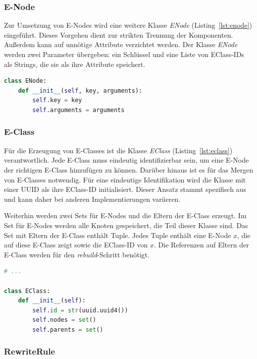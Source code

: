 \subsubsection{E-Node}

Zur Umsetzung von E-Nodes wird eine weitere Klasse \textit{ENode} (Listing~\ref{lst:enode}) eingeführt. Dieses Vorgehen dient zur strikten Trennung der Komponenten.
Außerdem kann auf unnötige Attribute verzichtet werden. 
Der Klasse \textit{ENode} werden zwei Parameter übergeben: ein Schlüssel und eine Liste von EClass-IDs als Strings, die sie als ihre Attribute speichert.

\begin{lstlisting}[language=Python, caption=Klasse \textit{ENode}, label={lst:enode}]
class ENode:
    def __init__(self, key, arguments):
        self.key = key
        self.arguments = arguments
\end{lstlisting}

\subsubsection{E-Class}

Für die Erzeugung von E-Classes ist die Klasse \textit{EClass} (Listing~\ref{lst:eclass}) verantwortlich. 
Jede E-Class muss eindeutig identifizierbar sein, um eine E-Node der richtigen E-Class hinzufügen zu können.
Darüber hinaus ist es für das Mergen von E-Classes notwendig.
Für eine eindeutige Identifikation wird die Klasse mit einer UUID als ihre EClass-ID initialisiert. Dieser Ansatz stammt spezifisch aus~\cite{2021-egg}
und kann daher bei anderen Implementierungen variieren.

Weiterhin werden zwei Sets für E-Nodes und die Eltern der E-Class erzeugt.
Im Set für E-Nodes werden alle Knoten gespeichert, die Teil dieser Klasse sind.
Das Set mit Eltern der E-Class enthält Tuple. 
Jedes Tuple enthält eine E-Node $x$, die auf diese E-Class zeigt sowie die EClass-ID von $x$.
Die Referenzen auf Eltern der E-Class werden für den \textit{rebuild}-Schritt benötigt.

\begin{lstlisting}[language=Python, caption=Klasse \textit{EClass}, label={lst:eclass}]
# ... 

class EClass:
    def __init__(self):
        self.id = str(uuid.uuid4())
        self.nodes = set()
        self.parents = set()
\end{lstlisting}

\subsubsection{RewriteRule}

